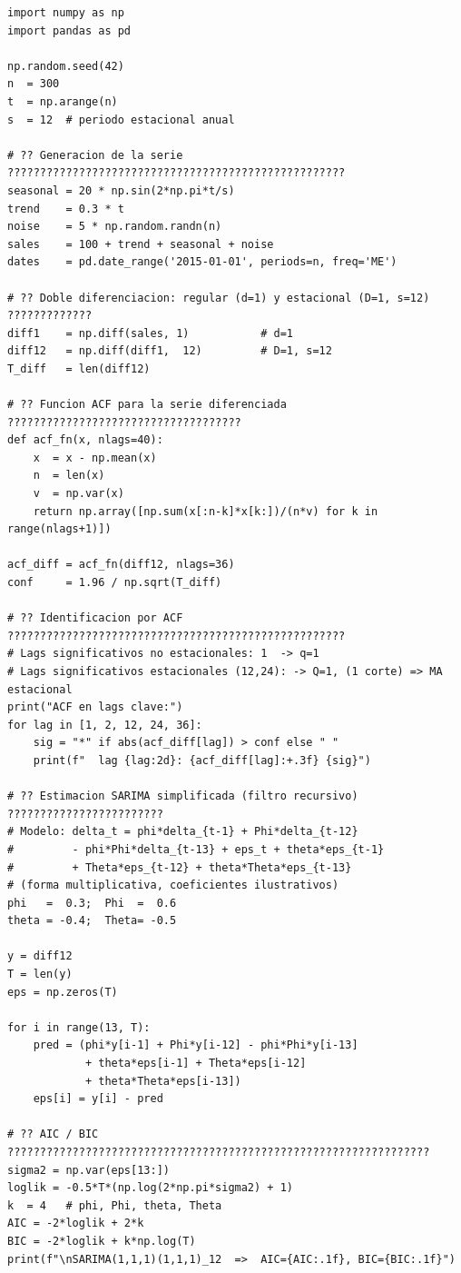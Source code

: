 \documentclass[12pt,a4paper]{article}
\begin{document}
\begin{lstlisting}[style=python, caption={Ejemplo 2: SARIMA en ventas mensuales},
                   label={cod:ej2}]
import numpy as np
import pandas as pd

np.random.seed(42)
n  = 300
t  = np.arange(n)
s  = 12  # periodo estacional anual

# ?? Generacion de la serie ????????????????????????????????????????????????????
seasonal = 20 * np.sin(2*np.pi*t/s)
trend    = 0.3 * t
noise    = 5 * np.random.randn(n)
sales    = 100 + trend + seasonal + noise
dates    = pd.date_range('2015-01-01', periods=n, freq='ME')

# ?? Doble diferenciacion: regular (d=1) y estacional (D=1, s=12) ?????????????
diff1    = np.diff(sales, 1)           # d=1
diff12   = np.diff(diff1,  12)         # D=1, s=12
T_diff   = len(diff12)

# ?? Funcion ACF para la serie diferenciada ????????????????????????????????????
def acf_fn(x, nlags=40):
    x  = x - np.mean(x)
    n  = len(x)
    v  = np.var(x)
    return np.array([np.sum(x[:n-k]*x[k:])/(n*v) for k in range(nlags+1)])

acf_diff = acf_fn(diff12, nlags=36)
conf     = 1.96 / np.sqrt(T_diff)

# ?? Identificacion por ACF ????????????????????????????????????????????????????
# Lags significativos no estacionales: 1  -> q=1
# Lags significativos estacionales (12,24): -> Q=1, (1 corte) => MA estacional
print("ACF en lags clave:")
for lag in [1, 2, 12, 24, 36]:
    sig = "*" if abs(acf_diff[lag]) > conf else " "
    print(f"  lag {lag:2d}: {acf_diff[lag]:+.3f} {sig}")

# ?? Estimacion SARIMA simplificada (filtro recursivo) ????????????????????????
# Modelo: delta_t = phi*delta_{t-1} + Phi*delta_{t-12}
#         - phi*Phi*delta_{t-13} + eps_t + theta*eps_{t-1}
#         + Theta*eps_{t-12} + theta*Theta*eps_{t-13}
# (forma multiplicativa, coeficientes ilustrativos)
phi   =  0.3;  Phi  =  0.6
theta = -0.4;  Theta= -0.5

y = diff12
T = len(y)
eps = np.zeros(T)

for i in range(13, T):
    pred = (phi*y[i-1] + Phi*y[i-12] - phi*Phi*y[i-13]
            + theta*eps[i-1] + Theta*eps[i-12]
            + theta*Theta*eps[i-13])
    eps[i] = y[i] - pred

# ?? AIC / BIC ?????????????????????????????????????????????????????????????????
sigma2 = np.var(eps[13:])
loglik = -0.5*T*(np.log(2*np.pi*sigma2) + 1)
k  = 4   # phi, Phi, theta, Theta
AIC = -2*loglik + 2*k
BIC = -2*loglik + k*np.log(T)
print(f"\nSARIMA(1,1,1)(1,1,1)_12  =>  AIC={AIC:.1f}, BIC={BIC:.1f}")
\end{lstlisting}
\end{document}
